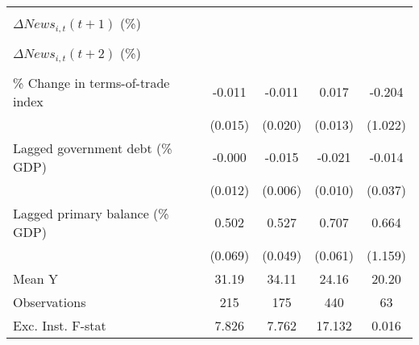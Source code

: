 {\begin{tabular}{l*{4}{c}}
                    &                     &                     &                     &                     \\
\addlinespace
$ \Delta News_{i,t}(t+1)$ (\%)&                     &                     &                     &                     \\
                    &                     &                     &                     &                     \\
\addlinespace
$ \Delta News_{i,t}(t+2)$ (\%)&                     &                     &                     &                     \\
                    &                     &                     &                     &                     \\
\addlinespace
\% Change in terms-of-trade index&      -0.011         &      -0.011         &       0.017         &      -0.204         \\
                    &     (0.015)         &     (0.020)         &     (0.013)         &     (1.022)         \\
\addlinespace
Lagged government debt (\% GDP)&      -0.000         &      -0.015\sym{**} &      -0.021\sym{**} &      -0.014         \\
                    &     (0.012)         &     (0.006)         &     (0.010)         &     (0.037)         \\
\addlinespace
Lagged primary balance (\% GDP)&       0.502\sym{***}&       0.527\sym{***}&       0.707\sym{***}&       0.664         \\
                    &     (0.069)         &     (0.049)         &     (0.061)         &     (1.159)         \\
\midrule
Mean Y              &       31.19         &       34.11         &       24.16         &       20.20         \\
Observations        &         215         &         175         &         440         &          63         \\
Exc. Inst. F-stat   &       7.826         &       7.762         &      17.132         &       0.016         \\
\bottomrule
\end{tabular}
}
